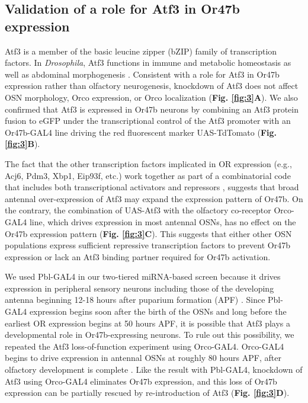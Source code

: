 \subsection*{Validation of a role for Atf3 in Or47b expression}

Atf3 is a member of the basic leucine zipper (bZIP) family of transcription factors.
In \emph{Drosophila}, Atf3 functions in immune and metabolic homeostasis as well as abdominal morphogenesis \cite{Brodesser_Jindra_Uhlirova_2012,a_Bohmann_Jindra_Uhlirova_2009}.
Consistent with a role for Atf3 in Or47b expression rather than olfactory neurogenesis, knockdown of Atf3 does not affect OSN morphology, Orco expression, or Orco localization (\textbf{Fig. \ref{fig:3}A}).
We also confirmed that Atf3 is expressed in Or47b neurons by combining an Atf3 protein fusion to eGFP under the transcriptional control of the Atf3 promoter with an Or47b-GAL4 line driving the red fluorescent marker UAS-TdTomato (\textbf{Fig. \ref{fig:3}B}).

The fact that the other transcription factors implicated in OR expression (e.g., Acj6, Pdm3, Xbp1, Eip93f, etc.) work together as part of a combinatorial code that includes both transcriptional activators and repressors \cite{Brochtrup_Hummel_Alenius_2012}, suggests that broad antennal over-expression of Atf3 may expand the expression pattern of Or47b.
On the contrary, the combination of UAS-Atf3 with the olfactory co-receptor Orco-GAL4 line, which drives expression in most antennal OSNs, has no effect on the Or47b expression pattern (\textbf{Fig. \ref{fig:3}C}).
This suggests that either other OSN populations express sufficient repressive transcription factors to prevent Or47b expression or lack an Atf3 binding partner required for Or47b activation.

We used Pbl-GAL4 in our two-tiered miRNA-based screen because it drives expression in peripheral sensory neurons including those of the developing antenna beginning 12-18 hours after puparium formation (APF) \cite{dnik_Dickson_Luo_Komiyama_2007}.
Since Pbl-GAL4 expression begins soon after the birth of the OSNs and long before the earliest OR expression begins at 50 hours APF, it is possible that Atf3 plays a developmental role in Or47b-expressing neurons.
To rule out this possibility, we repeated the Atf3 loss-of-function experiment using Orco-GAL4.
Orco-GAL4 begins to drive expression in antennal OSNs at roughly 80 hours APF, after olfactory development is complete \cite{s_Chiappe_Amrein_Vosshall_2004}.
Like the result with Pbl-GAL4, knockdown of Atf3 using Orco-GAL4 eliminates Or47b expression, and this loss of Or47b expression can be partially rescued by re-introduction of Atf3 (\textbf{Fig. \ref{fig:3}D}).